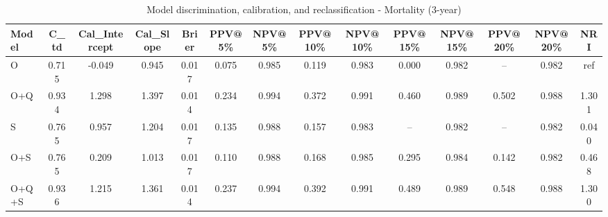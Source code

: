 \begin{table}[htbp]
\centering
\small
\caption{Model discrimination, calibration, and reclassification - Mortality (3-year)}
\label{tab:perf_mortality_3y}
\begin{tabular}{lccccccccccccc}
\toprule
Model & C\_td & Cal\_Intercept & Cal\_Slope & Brier & PPV@5\% & NPV@5\% & PPV@10\% & NPV@10\% & PPV@15\% & NPV@15\% & PPV@20\% & NPV@20\% & NRI \\
\midrule
O & 0.715 & -0.049 & 0.945 & 0.017 & 0.075 & 0.985 & 0.119 & 0.983 & 0.000 & 0.982 & -- & 0.982 & ref \\
O+Q & 0.934 & 1.298 & 1.397 & 0.014 & 0.234 & 0.994 & 0.372 & 0.991 & 0.460 & 0.989 & 0.502 & 0.988 & 1.301 \\
S & 0.765 & 0.957 & 1.204 & 0.017 & 0.135 & 0.988 & 0.157 & 0.983 & -- & 0.982 & -- & 0.982 & 0.040 \\
O+S & 0.765 & 0.209 & 1.013 & 0.017 & 0.110 & 0.988 & 0.168 & 0.985 & 0.295 & 0.984 & 0.142 & 0.982 & 0.468 \\
O+Q+S & 0.936 & 1.215 & 1.361 & 0.014 & 0.237 & 0.994 & 0.392 & 0.991 & 0.489 & 0.989 & 0.548 & 0.988 & 1.300 \\
\bottomrule
\end{tabular}
\end{table}